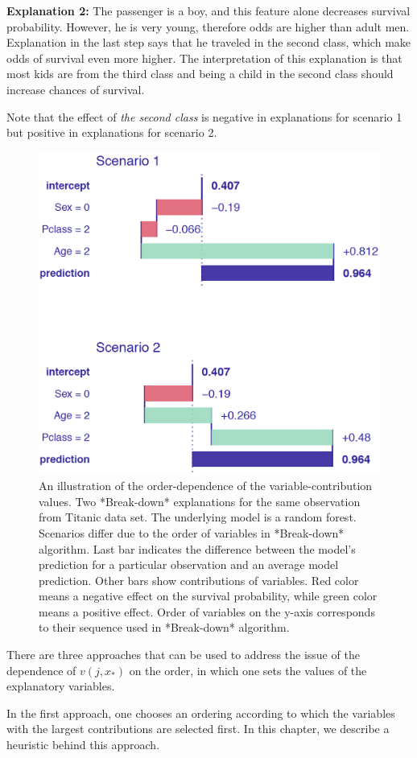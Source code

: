 \documentclass[]{krantz}
\begin{document}
\textbf{Explanation 2:}
The passenger is a boy, and this feature alone decreases survival probability.
However, he is very young, therefore odds are higher than adult men. Explanation in the last step says that he traveled in the second class, which make odds of survival even more higher. The interpretation of this explanation is that most kids are from the third class and being a child in the second class should increase chances of survival.

Note that the effect of \emph{the second class} is negative in explanations for scenario 1 but positive in explanations for scenario 2.

\begin{figure}

{\centering \includegraphics[width=0.5\linewidth]{figure/ordering} 

}

\caption{An illustration of the order-dependence of the variable-contribution values. Two *Break-down* explanations for the same observation from Titanic data set. The underlying model is a random forest. Scenarios differ due to the order of variables in *Break-down* algorithm. Last bar indicates the difference between the model's prediction for a particular observation and an average model prediction. Other bars show contributions of variables. Red color means a negative effect on the survival probability, while green color means a positive effect. Order of variables on the y-axis corresponds to their sequence used in *Break-down* algorithm.}\label{fig:ordering}
\end{figure}

There are three approaches that can be used to address the issue of the dependence of \(v(j, x_*)\) on the order, in which one sets the values of the explanatory variables.

In the first approach, one chooses an ordering according to which the variables with the largest contributions are selected first. In this chapter, we describe a heuristic behind this approach.
\end{document}
